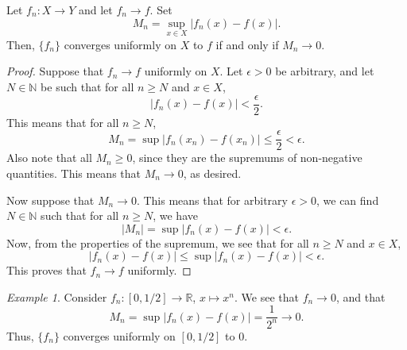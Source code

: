 \documentclass[11pt]{article}
\def\R{\mathbb{R}}
\def\N{\mathbb{N}}
\theoremstyle{definition}
\theoremstyle{remark}
\newtheorem*{example}{Example}
\numberwithin{equation}{module}
\begin{document}
    \begin{theorem} \label{th:M_supremum}
        Let $f_n\colon X \to Y$ and let $f_n \to f$. Set \[
            M_n = \sup_{x \in X} |f_n(x) - f(x)|.
        \]
        Then, $\{f_n\}$ converges uniformly on $X$ to $f$ if and only if $M_n \to
        0$.
    \end{theorem}
    \begin{proof}
        Suppose that $f_n \to f$ uniformly on $X$.
        Let $\epsilon > 0$ be arbitrary, and let $N \in \N$ be such that
        for all $n \geq N$ and $x \in X$, \[
            |f_n(x) - f(x)| < \frac{\epsilon}{2}.
        \]
        This means that for all $n \geq N$, \[
            M_n = \sup |f_n(x_n) - f(x_n)| \leq \frac{\epsilon}{2} < \epsilon.
        \]
        Also note that all $M_n \geq 0$, since they are the supremums of non-negative
        quantities.
        This means that $M_n \to 0$, as desired.

        Now suppose that $M_n \to 0$. This means that for arbitrary $\epsilon > 0$,
        we can find $N \in \N$ such that for all $n \geq N$, we have \[
            |M_n| = \sup |f_n(x) - f(x)| < \epsilon.
        \] 
        Now, from the properties of the supremum, we see that for all $n \geq N$ and
        $x \in X$, \[
            |f_n(x) - f(x)| \leq \sup |f_n(x) - f(x)| < \epsilon.
        \] 
        This proves that $f_n \to f$ uniformly.
    \end{proof} 
    \begin{example}
        Consider $f_n\colon [0, 1 /2] \to \R$, $x \mapsto x^n$. We see that $f_n \to
        0$, and that \[
            M_n = \sup|f_n(x) - f(x)| = \frac{1}{2^n} \to 0.
        \] 
        Thus, $\{f_n\}$ converges uniformly on $[0, 1 /2]$ to $0$.
    \end{example}
\end{document}
